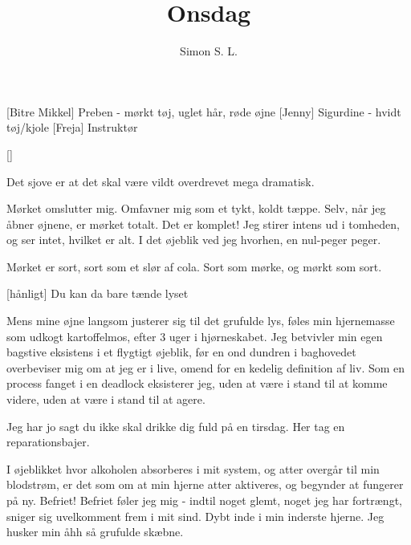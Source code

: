\documentclass[a4paper,11pt]{article}
\title{Onsdag}
\author{Simon S. L.}
\begin{document}
\maketitle

\begin{roles}
[Bitre Mikkel] Preben     - mørkt tøj, uglet hår, røde øjne
[Jenny] Sigurdine  - hvidt tøj/kjole
[Freja] Instruktør
\end{roles}

\begin{props}
[]
\end{props}


\begin{sketch}

Det sjove er at det skal være vildt overdrevet mega dramatisk.

 Mørket omslutter mig. Omfavner mig som et tykt, koldt tæppe.
    Selv, når jeg åbner øjnene, er mørket totalt. Det er komplet!
    Jeg stirer intens ud i tomheden, og ser intet, hvilket er alt.
    I det øjeblik ved jeg hvorhen, en nul-peger peger.


 Mørket er sort, sort som et slør af cola. Sort som mørke, og mørkt som sort.

[hånligt] Du kan da bare tænde lyset

 Mens mine øjne langsom justerer sig til det grufulde lys, føles min hjernemasse
    som udkogt kartoffelmos, efter 3 uger i hjørneskabet. Jeg betvivler
    min egen bagstive eksistens i et flygtigt øjeblik, før en ond dundren i baghovedet
    overbeviser mig om at jeg er i live, omend for en kedelig definition af liv.
    Som en process fanget i en deadlock eksisterer jeg, uden at være i stand til
    at komme videre, uden at være i stand til at agere.

 Jeg har jo sagt du ikke skal drikke dig fuld på en tirsdag.
 Her tag en reparationsbajer.

 I øjeblikket hvor alkoholen absorberes i mit system, og atter overgår til
    min blodstrøm, er det som om at min hjerne atter aktiveres, og begynder at
    fungerer på ny. Befriet! Befriet føler jeg mig - indtil noget glemt, noget
    jeg har fortrængt, sniger sig uvelkomment frem i mit sind. Dybt inde i min
    inderste hjerne. Jeg husker min åhh så grufulde skæbne.


\end{sketch}
\end{document}
